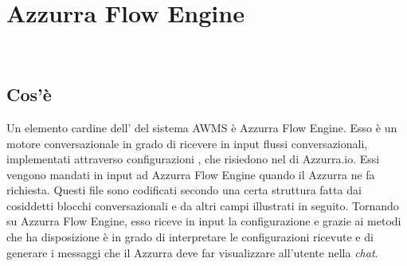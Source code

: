 
\chapter{Azzurra Flow Engine}
\label{cap:flow engine}
\\


\section{Cos'è}
Un elemento cardine dell' del sistema \gls{AWMS} è Azzurra Flow Engine. Esso è un motore conversazionale in grado di ricevere in input flussi conversazionali, implementati attraverso configurazioni , che risiedono nel  di Azzurra.io. Essi vengono mandati in input ad Azzurra Flow Engine quando il  Azzurra ne fa richiesta. Questi file sono codificati secondo una certa struttura fatta dai cosiddetti blocchi conversazionali e da altri campi illustrati in seguito. Tornando su Azzurra Flow Engine, esso riceve in input la configurazione  e grazie ai metodi che ha disposizione è in grado di interpretare le configurazioni  ricevute e di generare i messaggi che il  Azzurra deve far visualizzare all'utente nella \emph{chat}.

